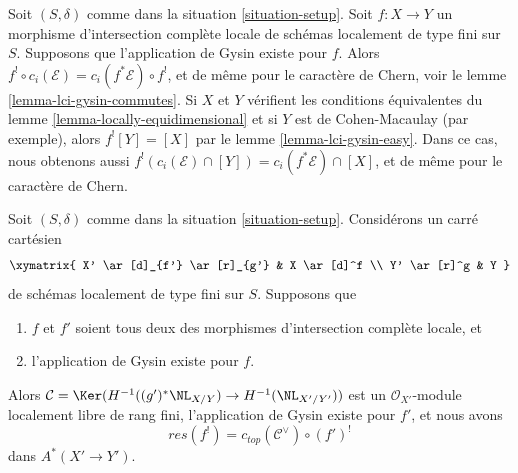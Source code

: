\begin{remark}
\label{remark-gysin-chern-classes}
Soit $(S, \delta)$ comme dans la situation \ref{situation-setup}.
Soit $f : X \to Y$ un morphisme d'intersection complète locale
de schémas localement de type fini sur $S$. Supposons que l'application
de Gysin existe pour $f$. Alors
$f^! \circ c_i(\mathcal{E}) = c_i(f^*\mathcal{E}) \circ f^!$,
et de même pour le caractère de Chern, voir le
lemme \ref{lemma-lci-gysin-commutes}.
Si $X$ et $Y$ vérifient les conditions équivalentes du
lemme \ref{lemma-locally-equidimensional} et si $Y$ est de Cohen-Macaulay
(par exemple), alors $f^![Y] = [X]$ par le lemme \ref{lemma-lci-gysin-easy}.
Dans ce cas, nous obtenons aussi
$f^!(c_i(\mathcal{E}) \cap [Y]) = c_i(f^*\mathcal{E}) \cap [X]$,
et de même pour le caractère de Chern.
\end{remark}

\begin{lemma}
\label{lemma-compare-gysin-base-change}
Soit $(S, \delta)$ comme dans la situation \ref{situation-setup}.
Considérons un carré cartésien
$$
\xymatrix{
X' \ar[d]_{f'} \ar[r]_{g'} &
X \ar[d]^f \\
Y' \ar[r]^g &
Y
}
$$
de schémas localement de type fini sur $S$. Supposons que
\begin{enumerate}
\item $f$ et $f'$ soient tous deux des morphismes d'intersection complète locale, et
\item l'application de Gysin existe pour $f$.
\end{enumerate}
Alors $\mathcal{C} = \Ker(H^{-1}((g')^*\NL_{X/Y}) \to H^{-1}(\NL_{X'/Y'}))$
est un $\mathcal{O}_{X'}$-module localement libre de rang fini, l'application de Gysin
existe pour $f'$, et nous avons
$$
res(f^!) = c_{top}(\mathcal{C}^\vee) \circ (f')^!
$$
dans $A^*(X' \to Y')$.
\end{lemma}

